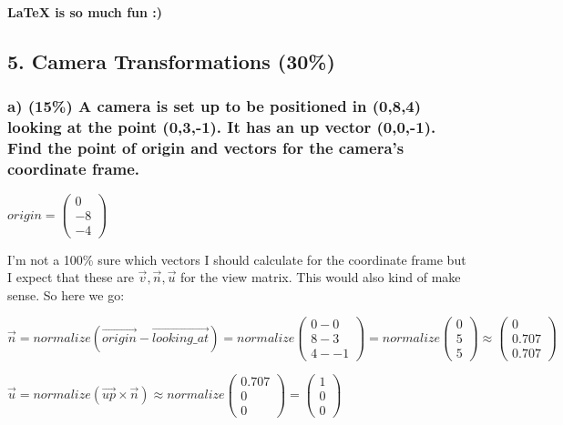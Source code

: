 \textbf{LaTeX is so much fun :)}

\newpage

\subsection{5.  Camera Transformations (30\%)} 
\subsubsection{a)  (15\%) A camera is set up to be positioned in (0,8,4) looking at the point (0,3,-1). It has an up vector (0,0,-1). Find the point of origin and vectors for the camera's coordinate frame.}

$origin = \left(\begin{array}{c}0\\-8\\-4\end{array}\right)$

I'm not a 100\% sure which vectors I should calculate for the coordinate frame but I expect that these are $ \vec{v}, \vec{n}, \vec{u} $ for the view matrix. This would also kind of make sense. So here we go:

$ 
    \vec{n}
=
    normalize(\vec{origin} - \vec{looking\_at})
=
    normalize\left(\begin{array}{c}
        0 - 0 \\
        8 - 3 \\
        4 - -1
    \end{array}\right) 
= 
    normalize\left(\begin{array}{c}
        0 \\
        5 \\
        5
    \end{array}\right)
\approx
    \left(\begin{array}{c}
        0\\
        0.707\\
        0.707
    \end{array}\right)
$

$
    \vec{u}
=
    normalize\left( \vec{up} \times \vec{n} \right)
\approx
    normalize\left(\begin{array}{c}
        0.707\\
        0\\
        0
    \end{array}\right)
=
    \left(\begin{array}{c}
        1\\
        0\\
        0
    \end{array}\right)
$

